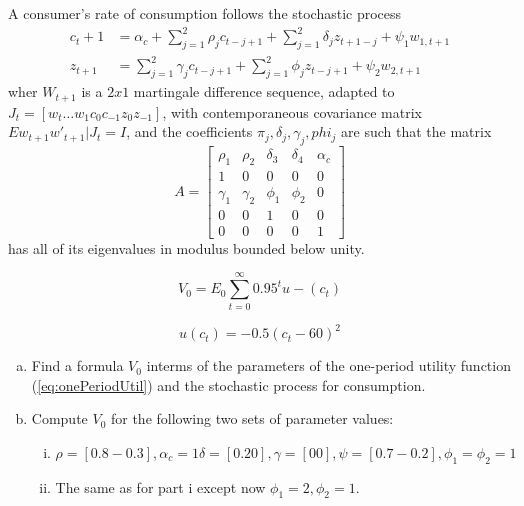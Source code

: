\documentclass{homework}
\begin{document}
\begin{homeworkProblem}[Problem 2.5]

  A consumer's rate of consumption follows the stochastic process
  \begin{equation}
    \begin{split}
      c_t+1 &= \alpha_c + \sum_{j=1}^2 \rho_j c_{t-j+1} + \sum_{j=1}^2 \delta_j z_{t+1-j} + \psi_1 w_{1, t+1} \\
      z_{t+1} &= \sum_{j=1}^2 \gamma_j c_{t-j+1} + \sum_{j=1}^2 \phi_j z_{t-j+1}   + \psi_2 w_{2, t+1}
    \end{split}
  \end{equation}
  wher $W_{t+1}$ is a $2 x 1$ martingale difference sequence, adapted to $J_t = \left[ w_t \dots w_1 c_0 c_{-1} z_0 z_{-1} \right] $, with contemporaneous covariance matrix $E w_{t+1}w'_{t+1} | J_t = I$, and the coefficients $\pi_j, \delta_j, \gamma_j, phi_j$ are such that the matrix
  $$A = \begin{bmatrix}
  \rho_1 & \rho_2 & \delta_3 & \delta_4 & \alpha_c \\
  1 &0 & 0 & 0 & 0 \\
  \gamma_1 & \gamma_2 & \phi_1 & \phi_2 & 0 \\
   0 & 0 & 1 & 0 & 0 \\
   0 & 0 & 0 & 0 & 1
   \end{bmatrix}$$ has all of its eigenvalues in modulus bounded below unity.

   \begin{equation}
     V_0 = E_0 \sum_{t=0}^{\infty} 0.95^t u-(c_t)
   \end{equation}

   \begin{equation} \label{eq:onePeriodUtil}
     u(c_t) = -0.5(c_t - 60)^2
   \end{equation}

   \begin{enumerate}[a.]
     \item Find a formula $V_0$ interms of the parameters of the one-period utility function (\ref{eq:onePeriodUtil}) and the stochastic process for consumption.
     \item Compute $V_0$ for the following two sets of parameter values:
     \begin{enumerate}[i.]
       \item $\rho=\left[ 0.8 -0.3 \right], \alpha_c =1 \delta = \left[ 0.2 0 \right] , \gamma = \left[ 0 0 \right], \psi = \left[ 0.7 -0.2 \right], \phi_1 = \phi_2 = 1  $
       \item The same as for part i except now $\phi_1 = 2, \phi_2 = 1$.
     \end{enumerate}


\end{enumerate}
\end{homeworkProblem}
\end{document}
